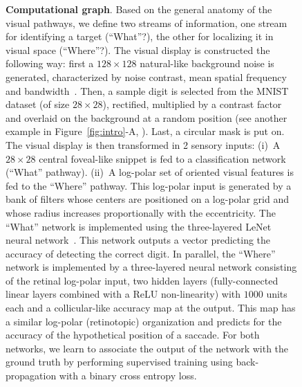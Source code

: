 \begin{figure}[t!]%
	\caption{%
		{\bf Computational graph}. Based on the general anatomy of the visual pathways, we define two streams of information, one stream for identifying a target (``What''?), the other for localizing it in visual space (``Where''?).
		\A The visual display is constructed the following way: first a $128\times 128$ natural-like background noise is generated, characterized by noise contrast, mean spatial frequency and bandwidth~\cite{Sanz12}. Then, a sample digit is selected from the MNIST dataset (of size $28\times 28$), rectified, multiplied by a contrast factor and overlaid on the background at a random position (see another example in Figure~\ref{fig:intro}-A, \DIS ). Last, a circular mask is put on. %
		\B The visual display is then transformed in 2 sensory inputs: (i)~A $28\times 28$ central foveal-like snippet is fed to a classification network (``What'' pathway). (ii)~A log-polar set of oriented visual features is fed to the ``Where'' pathway. This log-polar input is generated by a bank of filters whose centers are positioned on a log-polar grid and whose radius increases proportionally with the eccentricity. %
		\C The ``What'' network is implemented using the three-layered LeNet neural network~\cite{Lecun1998}. This network outputs a vector predicting the accuracy of detecting the correct digit. In parallel, the ``Where'' network is implemented by a three-layered neural network consisting of the retinal log-polar input, two hidden layers (fully-connected linear layers combined with a ReLU non-linearity) with $1000$ units each and a collicular-like accuracy map at the output. This map has a similar log-polar (retinotopic) organization and predicts for the accuracy of the hypothetical position of a saccade. For both networks, we learn to associate the output of the network with the ground truth by performing supervised training using back-propagation with a binary cross entropy loss.
}
\end{figure}
